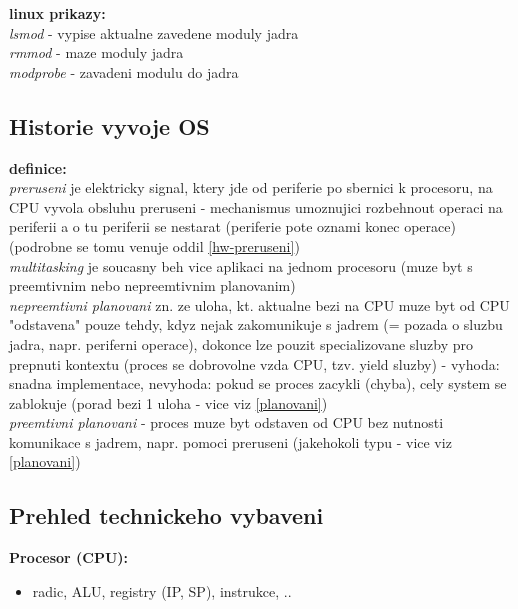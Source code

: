\documentclass[a4paper, 11pt]{article}
\begin{document}
\noindent\textbf{linux prikazy:} \\[0.5em]
\textit{lsmod} - vypise aktualne zavedene moduly jadra \\[0.2em]
\textit{rmmod} - maze moduly jadra \\[0.2em]
\textit{modprobe} - zavadeni modulu do jadra \\[0.2em]

\newpage

\subsection{Historie vyvoje OS}

\noindent\textbf{definice:} \\[0.5em] \label{hist-preruseni} \label{ne-preemtive}
\textit{preruseni} je elektricky signal, ktery jde od periferie po sbernici k procesoru, na CPU vyvola obsluhu preruseni - mechanismus umoznujici rozbehnout operaci na periferii a o tu periferii se nestarat (periferie pote oznami konec operace) (podrobne se tomu venuje oddil \ref{hw-preruseni}) \\[0.2em]
\textit{multitasking} je soucasny beh vice aplikaci na jednom procesoru (muze byt s preemtivnim nebo nepreemtivnim planovanim) \\[0.2em]
\textit{nepreemtivni planovani} zn. ze uloha, kt. aktualne bezi na CPU muze byt od CPU "odstavena" pouze tehdy, kdyz nejak zakomunikuje s jadrem (= pozada o sluzbu jadra, napr. periferni operace), dokonce lze pouzit specializovane sluzby pro prepnuti kontextu (proces se dobrovolne vzda CPU, tzv. yield sluzby) - vyhoda: snadna implementace, nevyhoda: pokud se proces zacykli (chyba), cely system se zablokuje (porad bezi 1 uloha - vice viz \ref{planovani}) \\[0.2em]
\textit{preemtivni planovani} - proces muze byt odstaven od CPU bez nutnosti komunikace s jadrem, napr. pomoci preruseni (jakehokoli typu - vice viz \ref{planovani}) \\[1em]

\subsection{Prehled technickeho vybaveni}

\noindent\textbf{Procesor (CPU):}
\begin{itemize}
    \item radic, ALU, registry (IP, SP), instrukce, .. \\
\end{itemize}
\end{document}
